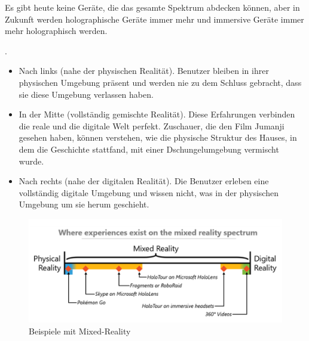 Es gibt heute keine Geräte, die das gesamte Spektrum abdecken können, aber in Zukunft werden holographische Geräte immer mehr und immersive Geräte immer mehr holographisch werden.
\begin{description}
	 \item . 
\begin{itemize}
	\item Nach links (nahe der physischen Realität). Benutzer bleiben in ihrer physischen Umgebung präsent und werden nie zu dem Schluss gebracht, dass sie diese Umgebung verlassen haben.
	\item In der Mitte (vollständig gemischte Realität). Diese Erfahrungen verbinden die reale und die digitale Welt perfekt. Zuschauer, die den Film Jumanji gesehen haben, können verstehen, wie die physische Struktur des Hauses, in dem die Geschichte stattfand, mit einer Dschungelumgebung vermischt wurde.
	\item Nach rechts (nahe der digitalen Realität). Die Benutzer erleben eine vollständig digitale Umgebung und wissen nicht, was in der physischen Umgebung um sie herum geschieht.
\end{itemize}
\end{description}

\begin{figure}[ht]
	\centering
	\includegraphics[width=\textwidth,height=\textheight,keepaspectratio]{images/Beispiele mit Mixed-Reality.png}
	\caption{Beispiele mit Mixed-Reality}
	\label{Mixed-Reality1}
\end{figure}


